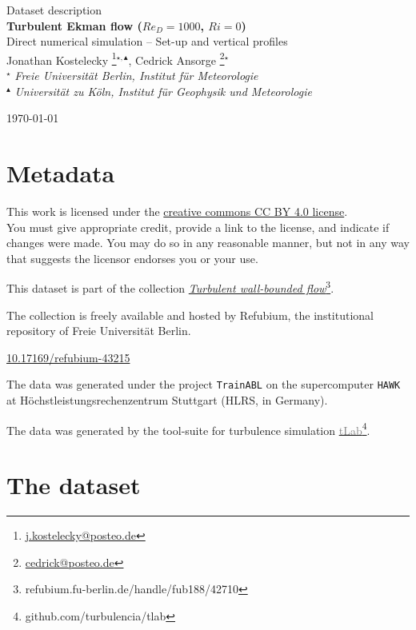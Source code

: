 \documentclass[11pt]{article}
\date{\nodate}
\makeatletter
\newcommand{\dstitle}{Turbulent Ekman flow ($Re_D=1000$, $Ri=0$)}
\newcommand{\subtitle}{Direct numerical simulation -- Set-up and vertical profiles}
\newcommand{\doi}{10.17169/refubium-43215}
\newcommand{\tlabName}{\textcolor{gray}{tLab}}
\newcommand{\authors}{
    Jonathan Kostelecky \footnote{\href{mailto:j.kostelecky@posteo.de}{j.kostelecky@posteo.de}}$^{\star,\blacktriangle}$, \hspace{0.05cm}  
    Cedrick Ansorge     \footnote{\href{mailto:cedrick@posteo.de}{cedrick@posteo.de}}$^\star$ \\  
    {\small \light{$^\star$ \emph{ Freie Universit\"at Berlin, Institut f\"ur Meteorologie} \\
    $^{\blacktriangle}$ \emph{Universit\"at zu K\"oln, Institut f\"ur Geophysik und Meteorologie}}}}
\newcommand{\light}[1]{\textcolor{black!80}{#1}}
\newcommand{\printdoi}[1]{\href{https://dx.doi.org/#1}{#1}}
\makeatother
\begin{document}
{ \selectfont
\begin{centering}

 \light{\large Dataset description} \\[1em] 
 {\LARGE \bfseries \sffamily\dstitle} \\[1em]
 \light{\large\subtitle} \\[1em]
 \authors\\ 
\end{centering}
\light{\hfill \today}
}


\section{Metadata}
\begin{description}
\sffamily
\item[\textcopyright] This work is licensed under the \href{https://creativecommons.org/licenses/by/4.0}{creative commons CC BY 4.0 license}. \\ {\small\light{You must give appropriate credit, provide a link to the license, and indicate if changes were made. You may do so in any reasonable manner, but not in any way that suggests the licensor endorses you or your use. }}
\item[\sffamily Collection] This dataset is part of the collection \href{https://refubium.fu-berlin.de/handle/fub188/42710}{\emph{Turbulent wall-bounded flow}\footnote{\url{refubium.fu-berlin.de/handle/fub188/42710}}}.

{\small \light{The collection is freely available and hosted by Refubium, the  institutional repository of Freie Universit\"at Berlin.}}

\item[\sffamily DOI]\printdoi{\doi}
\item[\sffamily HPC systems] The data was generated under the project \texttt{TrainABL} on the supercomputer \texttt{HAWK} at Höchstleistungsrechenzentrum Stuttgart (HLRS, in Germany). 
\item[\sffamily Code] The data was generated by the tool-suite for turbulence simulation \href{https://github.com/turbulencia/tlab}{\tlabName\footnote{\url{github.com/turbulencia/tlab}}}.
\end{description}

\section{The dataset}
\end{document}
